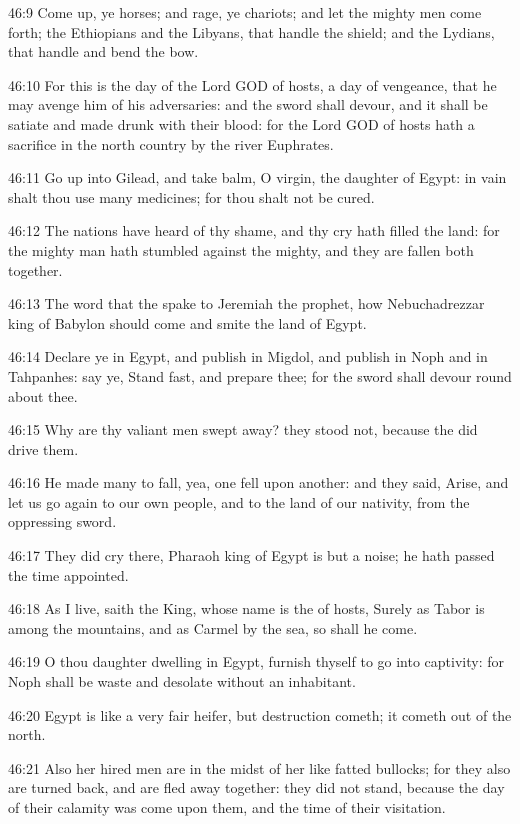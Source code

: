 46:9 Come up, ye horses; and rage, ye chariots; and let the mighty men
come forth; the Ethiopians and the Libyans, that handle the shield;
and the Lydians, that handle and bend the bow.

46:10 For this is the day of the Lord GOD of hosts, a day of
vengeance, that he may avenge him of his adversaries: and the sword
shall devour, and it shall be satiate and made drunk with their blood:
for the Lord GOD of hosts hath a sacrifice in the north country by the
river Euphrates.

46:11 Go up into Gilead, and take balm, O virgin, the daughter of
Egypt: in vain shalt thou use many medicines; for thou shalt not be
cured.

46:12 The nations have heard of thy shame, and thy cry hath filled the
land: for the mighty man hath stumbled against the mighty, and they
are fallen both together.

46:13 The word that the \LORD spake to Jeremiah the prophet, how
Nebuchadrezzar king of Babylon should come and smite the land of
Egypt.

46:14 Declare ye in Egypt, and publish in Migdol, and publish in Noph
and in Tahpanhes: say ye, Stand fast, and prepare thee; for the sword
shall devour round about thee.

46:15 Why are thy valiant men swept away? they stood not, because the
\LORD did drive them.

46:16 He made many to fall, yea, one fell upon another: and they said,
Arise, and let us go again to our own people, and to the land of our
nativity, from the oppressing sword.

46:17 They did cry there, Pharaoh king of Egypt is but a noise; he
hath passed the time appointed.

46:18 As I live, saith the King, whose name is the \LORD of hosts,
Surely as Tabor is among the mountains, and as Carmel by the sea, so
shall he come.

46:19 O thou daughter dwelling in Egypt, furnish thyself to go into
captivity: for Noph shall be waste and desolate without an inhabitant.

46:20 Egypt is like a very fair heifer, but destruction cometh; it
cometh out of the north.

46:21 Also her hired men are in the midst of her like fatted bullocks;
for they also are turned back, and are fled away together: they did
not stand, because the day of their calamity was come upon them, and
the time of their visitation.

